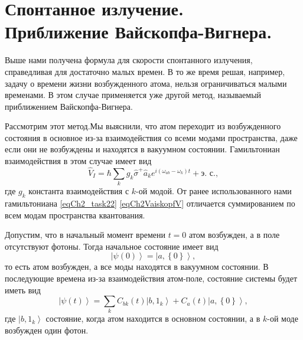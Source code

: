 \section{Спонтанное излучение. \\
  Приближение Вайскопфа-Вигнера.}
Выше нами получена формула для скорости спонтанного излучения,
справедливая для достаточно малых времен. В то же время решая,
например, задачу о времени жизни возбужденного атома, нельзя
ограничиваться малыми временами. В этом случае применяется уже другой
метод, называемый приближением Вайскопфа-Вигнера.

Рассмотрим этот метод.Мы выяснили, что атом переходит из возбужденного
состояния в основное из-за взаимодействия со всеми модами
пространства, даже если они не возбуждены и находятся в вакуумном
состоянии. Гамильтониан взаимодействия в этом случае имеет вид
\begin{equation}
\hat{V}_I = \hbar \sum_{k} g_k \hat{\sigma}^{+}\hat{a}_k e^{i\left(
\omega_{ab} - \omega_k
\right)t} + \mbox{э. с.},
\label{eqCh2VaiskopfV}
\end{equation}
где $g_k$ константа взаимодействия с $k$-ой модой. От ранее
использованного нами гамильтониана \eqref{eqCh2_task22}
\eqref{eqCh2VaiskopfV} отличается суммированием по всем модам
пространства квантования. 

Допустим, что в начальный момент времени $t=0$ атом возбужден, а в
поле отсутствуют фотоны. Тогда начальное состояние имеет вид
\begin{equation}
\left|\psi\left(0\right)\right> =
 \left|a, \left\{0\right\}\right>,
\nonumber
\end{equation}
то есть атом возбужден, а все моды находятся в вакуумном состоянии. В
последующие времена из-за взаимодействия атом-поле, состояние системы
будет иметь вид
\begin{equation}
\left|\psi\left(t\right)\right> =
\sum_{k} C_{bk}\left(t\right) \left|b, 1_k\right>
+
C_{a}\left(t\right) \left|a, \left\{0\right\}\right>,
\label{eqCh2Vaiskopf3}
\end{equation}
где $\left|b, 1_k\right>$ состояние, когда атом находится в основном
состоянии, а в $k$-ой моде возбужден один фотон.

